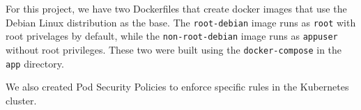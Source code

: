 For this project, we have two Dockerfiles that create docker images that use the Debian Linux distribution
as the base. The \verb|root-debian| image runs as \verb|root| with root privelages by
default, while the \verb|non-root-debian| image runs as \verb|appuser| without root privileges.
These two were built using the \verb|docker-compose| in the \verb|app| directory.

We also created Pod Security Policies to enforce specific rules in the Kubernetes cluster.

